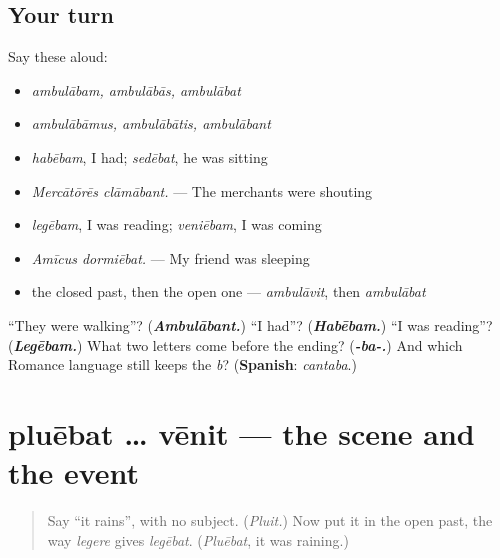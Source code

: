 \subsection*{Your turn}
Say these aloud:

\begin{itemize}
\raggedright
  \item \emph{ambulābam, ambulābās, ambulābat}
  \item \emph{ambulābāmus, ambulābātis, ambulābant}
  \item \emph{habēbam}, I had; \emph{sedēbat}, he was sitting
  \item \emph{Mercātōrēs clāmābant.} — The merchants were shouting
  \item \emph{legēbam}, I was reading; \emph{veniēbam}, I was coming
  \item \emph{Amīcus dormiēbat.} — My friend was sleeping
  \item the closed past, then the open one — \emph{ambulāvit}, then \emph{ambulābat}
\end{itemize}

\begin{tcolorbox}[breakable,colback=teal!4,colframe=teal!35!black,title={Before you move on}]
\textquotedblleft{}They were walking\textquotedblright{}? (\emph{\textbf{Ambulābant.}}) \textquotedblleft{}I had\textquotedblright{}? (\emph{\textbf{Habēbam.}}) \textquotedblleft{}I was reading\textquotedblright{}? (\emph{\textbf{Legēbam.}}) What two letters come before the ending? (\emph{\textbf{-ba-.}}) And which Romance language still keeps the \emph{b}? (\textbf{Spanish}: \emph{cantaba}.)
\end{tcolorbox}
\section[pluēbat … vēnit]{pluēbat … vēnit — the scene and the event}

\label{lesson:LA-C281-pluebat-venit}



\begin{quote}
Say \textquotedblleft{}it rains\textquotedblright{}, with no subject. (\emph{Pluit.}) Now put it in the open past, the way \emph{legere} gives \emph{legēbat}. (\emph{Pluēbat}, it was raining.)
\end{quote}

